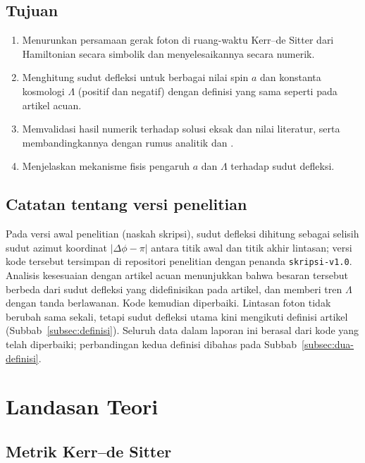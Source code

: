 \documentclass[11pt,a4paper]{article}
\begin{document}
\subsection{Tujuan}

\begin{enumerate}
  \item Menurunkan persamaan gerak foton di ruang-waktu Kerr--de Sitter dari Hamiltonian secara simbolik
        dan menyelesaikannya secara numerik.
  \item Menghitung sudut defleksi untuk berbagai nilai spin $a$ dan konstanta kosmologi $\Lambda$ (positif
        dan negatif) dengan definisi yang sama seperti pada artikel acuan.
  \item Memvalidasi hasil numerik terhadap solusi eksak dan nilai literatur, serta membandingkannya dengan
        rumus analitik \citet{belhaj2022light} dan \citet{huang2025influence}.
  \item Menjelaskan mekanisme fisis pengaruh $a$ dan $\Lambda$ terhadap sudut defleksi.
\end{enumerate}

\subsection{Catatan tentang versi penelitian}

Pada versi awal penelitian (naskah skripsi), sudut defleksi dihitung sebagai selisih sudut azimut koordinat
$\lvert\Delta\phi - \pi\rvert$ antara titik awal dan titik akhir lintasan; versi kode tersebut tersimpan di
repositori penelitian dengan penanda \texttt{skripsi-v1.0}. Analisis kesesuaian dengan artikel acuan
menunjukkan bahwa besaran tersebut berbeda dari sudut defleksi yang didefinisikan pada artikel, dan memberi
tren $\Lambda$ dengan tanda berlawanan. Kode kemudian diperbaiki. Lintasan foton tidak berubah sama sekali, tetapi sudut defleksi utama kini mengikuti
definisi artikel (Subbab~\ref{subsec:definisi}). Seluruh data dalam laporan ini berasal dari kode yang
telah diperbaiki; perbandingan kedua definisi dibahas pada Subbab~\ref{subsec:dua-definisi}.

\section{Landasan Teori}

\subsection{Metrik Kerr--de Sitter}
\end{document}
